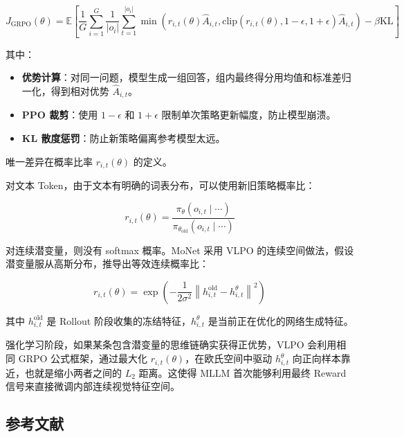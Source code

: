 \[
J_{\text{GRPO}}(\theta) =
\mathbb{E}\left[
\frac{1}{G}\sum_{i=1}^{G}\frac{1}{|o_i|}
\sum_{t=1}^{|o_i|}
\min\left(
r_{i,t}(\theta)\hat A_{i,t},
\mathrm{clip}(r_{i,t}(\theta),1-\epsilon,1+\epsilon)\hat A_{i,t}
\right)
-\beta\mathrm{KL}
\right]
\]

其中：

\begin{itemize}
\tightlist
\item
  \textbf{优势计算}：对同一问题，模型生成一组回答，组内最终得分用均值和标准差归一化，得到相对优势 \(\hat A_{i,t}\)。
\item
  \textbf{PPO 裁剪}：使用 \(1-\epsilon\) 和 \(1+\epsilon\) 限制单次策略更新幅度，防止模型崩溃。
\item
  \textbf{KL 散度惩罚}：防止新策略偏离参考模型太远。
\end{itemize}

唯一差异在概率比率 \(r_{i,t}(\theta)\) 的定义。

对文本 Token，由于文本有明确的词表分布，可以使用新旧策略概率比：

\[
r_{i,t}(\theta) =
\frac{\pi_{\theta}(o_{i,t}\mid\cdots)}
{\pi_{\theta_{\text{old}}}(o_{i,t}\mid\cdots)}
\]

对连续潜变量，则没有 softmax 概率。MoNet 采用 VLPO 的连续空间做法，假设潜变量服从高斯分布，推导出等效连续概率比：

\[
r_{i,t}(\theta) =
\exp\left(
-\frac{1}{2\sigma^2}
\left\lVert h_{i,t}^{\text{old}}-h_{i,t}^{\theta}\right\rVert^2
\right)
\]

其中 \(h_{i,t}^{\text{old}}\) 是 Rollout 阶段收集的冻结特征，\(h_{i,t}^{\theta}\) 是当前正在优化的网络生成特征。

强化学习阶段，如果某条包含潜变量的思维链确实获得正优势，VLPO 会利用相同 GRPO 公式框架，通过最大化 \(r_{i,t}(\theta)\)，在欧氏空间中驱动 \(h_{i,t}^{\theta}\) 向正向样本靠近，也就是缩小两者之间的 \(L_2\) 距离。这使得 MLLM 首次能够利用最终 Reward 信号来直接微调内部连续视觉特征空间。

\FloatBarrier
{}
\hypertarget{ux53c2ux8003ux6587ux732e-148}{%
\subsection{参考文献}\label{ux53c2ux8003ux6587ux732e-148}}

